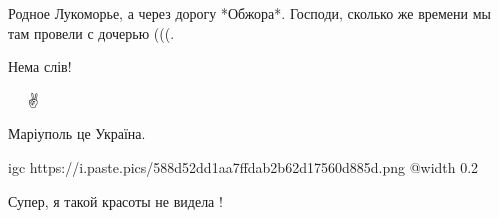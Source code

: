  
 
 
 
 

\qqSecCmt


Родное Лукоморье, а через дорогу *Обжора*. Господи, сколько же времени мы там провели с дочерью (((.


Нема слів!


💖🙌🙏🙏🙏✌


Маріуполь це Україна.


\ifcmt
  igc https://i.paste.pics/588d52dd1aa7ffdab2b62d17560d885d.png
	@width 0.2
\fi


Супер, я такой красоты не видела !
